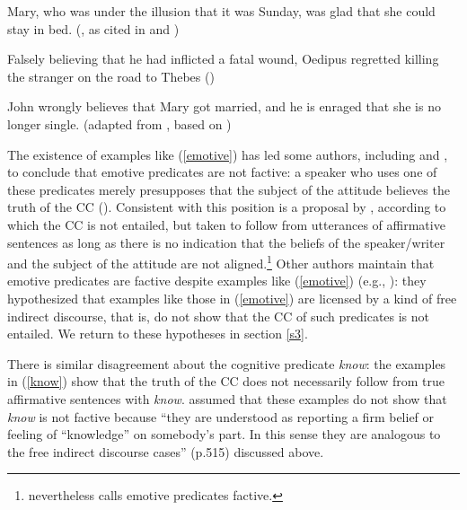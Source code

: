 \documentclass[11pt,fleqn]{article}
\newcommand{\6}{\mbox{$[\hspace*{-.6mm}[$}}
\newcommand{\9}{\mbox{$]\hspace*{-.6mm}]$}}
\begin{document}
\begin{exe}
\ex\label{emotive}
\begin{xlist}

\ex\label{heim2} Mary, who was under the illusion that it was Sunday, was glad that she could stay in bed. (\citealt{klein1975}, as cited in \citealt[122]{gazdar79a} and \citealt[fn37]{heim92}) 

\ex Falsely believing that he had inflicted a fatal wound, Oedipus regretted killing the stranger on the road to Thebes \hfill (\citealt{klein1975})

\ex John wrongly believes that Mary got married, and he is enraged that she is no longer single. \hspace*{.2cm} \hfill (adapted from \citealt{egre2008}, based on \citealt{schlenker03})

\end{xlist}
\end{exe}
The existence of examples like (\ref{emotive}) has led some authors, including \citet{klein1975,giannakidou1998,schlenker2003} and \citet{egre2008}, to conclude that emotive predicates are not factive: a speaker who uses one of these predicates merely presupposes that the subject of the attitude believes the truth of the CC (\citealt{heim92}). Consistent with this position is a proposal by \citet{karttunen2016}, according to which the CC is not entailed, but taken to follow from utterances of affirmative sentences as long as there is no indication that the beliefs of the speaker/writer and the subject of the attitude are not aligned.\footnote{\citet{karttunen2016} nevertheless calls emotive predicates factive.}  Other authors maintain that emotive predicates are factive despite examples like (\ref{emotive}) (e.g., \citealt{gazdar79a,abrusan2011,anand-hacquard2014}): they hypothesized that examples like those in (\ref{emotive}) are licensed by a kind of free indirect discourse, that is, do not show that the CC of such predicates is not entailed. We return to these hypotheses in section \ref{s3}.

There is similar disagreement about the cognitive predicate {\em know}: the examples in (\ref{know}) show that the truth of the CC does not necessarily follow from true affirmative sentences with {\em know}. \citet{abrusan2011} assumed that these examples do not show that {\em know} is not factive because ``they are understood as reporting a firm belief or feeling of ``knowledge'' on somebody's part. In this sense they are analogous to the free indirect discourse cases'' (p.515) discussed above.
\end{document}
